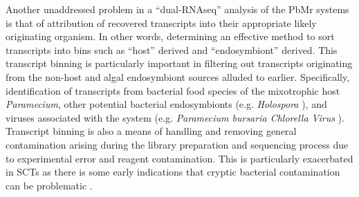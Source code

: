 Another unaddressed problem in a ``dual-RNAseq'' analysis of the PbMr systems is that of attribution of recovered transcripts
into their appropriate likely originating organism.  In other words, determining an effective method to sort transcripts into
bins such as ``host'' derived and ``endosymbiont'' derived.  This transcript binning is particularly important in filtering
out transcripts originating from the non-host and algal endosymbiont sources alluded to earlier. Specifically, identification
of transcripts from bacterial food species of the mixotrophic host \textit{Paramecium}, other potential bacterial endosymbionts (e.g. 
\textit{Holospora} \citep{Gortz2009}), and viruses associated with the system (e.g. \textit{Paramecium bursaria Chlorella Virus} \citep{VanEtten1982}).
Transcript binning is also a means of handling and removing general contamination arising during the library preparation and sequencing
process due to experimental error and reagent contamination.  This is particularly exacerbated in SCTs as there is some early indications 
that cryptic bacterial contamination can be problematic \citep{Kolisko2014}.






